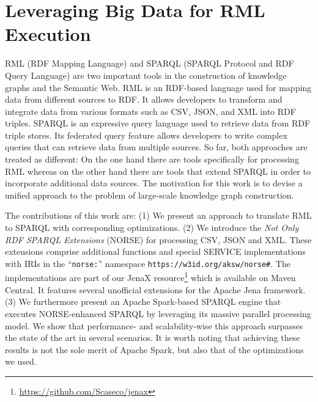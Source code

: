 

\section{Leveraging Big Data for RML Execution}
RML (RDF Mapping Language) and SPARQL (SPARQL Protocol and RDF Query Language) are two important tools in the construction of knowledge graphs and the Semantic Web.
RML is an RDF-based language used for mapping data from different sources to RDF. It allows developers to transform and integrate data from various formats such as CSV, JSON, and XML into RDF triples.
SPARQL is an expressive query language used to retrieve data from RDF triple stores. Its federated query feature allows developers to write complex queries that can retrieve data from multiple sources.
So far, both approaches are treated as different: On the one hand there are tools specifically for
processing RML whereas on the other hand there are tools that extend SPARQL in order to incorporate additional data sources.
The motivation for this work is to devise a unified approach to the problem of large-scale knowledge graph construction.

The contributions of this work are: (1) We present an approach to translate RML to SPARQL with corresponding optimizations.
(2) We introduce the \emph{Not Only RDF SPARQL Extensions} (NORSE) for processing CSV, JSON and XML.
These extensions comprise additional functions and special SERVICE implementations with IRIs in the ``\texttt{norse:}'' namespace \texttt{https://w3id.org/aksw/norse\#}.
 The implementations are part of our JenaX resource\footnote{\url{https://github.com/Scaseco/jenax}} which is available on Maven Central. It features several unofficial extensions for the Apache Jena framework.
(3) We furthermore present an Apache Spark-based SPARQL engine that executes NORSE-enhanced SPARQL by leveraging its massive parallel processing model. We show that performance- and scalability-wise this approach surpasses the state of the art in several scenarios.
It is worth noting that achieving these results is not the sole merit of Apache Spark, but also that of the optimizations we used.

